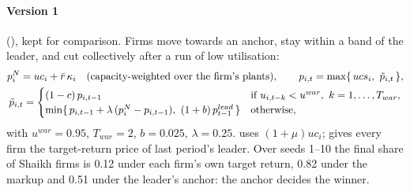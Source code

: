 \paragraph{Version 1} (), kept for comparison. Firms move
towards an anchor, stay within a band of the leader, and cut collectively after a run of low
utilisation:
\begin{gather*}
p^N_i = uc_i + \bar r\,\kappa_i \quad\text{(capacity-weighted over the firm's plants)}, \qquad
p_{i,t} = \max\{\, ucs_i,\ \tilde p_{i,t} \,\}, \\
\tilde p_{i,t} =
\begin{cases}
(1-c)\, p_{i,t-1} & \text{if } u_{i,t-k} < u^{war},\ k = 1,\dots,T_{war}, \\
\min\{\, p_{i,t-1} + \lambda\,(p^{N}_i - p_{i,t-1}),\ (1+b)\, p^{lead}_{t-1} \,\} & \text{otherwise,}
\end{cases}
\end{gather*}
with $u^{war} = 0.95$, $T_{war} = 2$, $b = 0.025$, $\lambda = 0.25$.
 uses $(1+\mu)uc_i$;  gives every firm the
target-return price of last period's leader. Over seeds 1--10 the final share of Shaikh
firms is 0.12 under each firm's own target return, 0.82 under the markup and 0.51 under the
leader's anchor: the anchor decides the winner.

